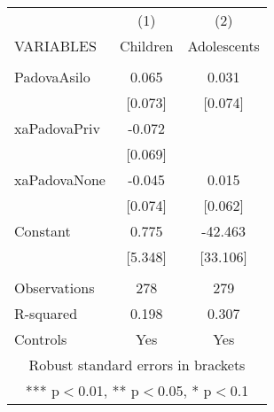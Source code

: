 \begin{tabular}{lcc} \hline
 & (1) & (2) \\
VARIABLES & Children & Adolescents \\ \hline
 &  &  \\
PadovaAsilo & 0.065 & 0.031 \\
 & [0.073] & [0.074] \\
xaPadovaPriv & -0.072 &  \\
 & [0.069] &  \\
xaPadovaNone & -0.045 & 0.015 \\
 & [0.074] & [0.062] \\
Constant & 0.775 & -42.463 \\
 & [5.348] & [33.106] \\
 &  &  \\
Observations & 278 & 279 \\
R-squared & 0.198 & 0.307 \\
 Controls & Yes & Yes \\ \hline
\multicolumn{3}{c}{ Robust standard errors in brackets} \\
\multicolumn{3}{c}{ *** p$<$0.01, ** p$<$0.05, * p$<$0.1} \\
\end{tabular}
